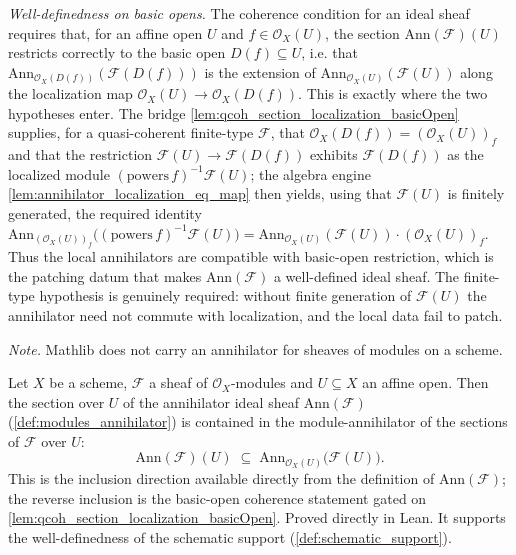 \begin{definition}
  \emph{Well-definedness on basic opens.} The coherence condition for an ideal
  sheaf requires that, for an affine open \(U\) and \(f \in \mathcal{O}_X(U)\),
  the section \(\mathrm{Ann}(\mathcal{F})(U)\) restricts correctly to the basic
  open \(D(f) \subseteq U\), i.e. that
  \(\mathrm{Ann}_{\mathcal{O}_X(D(f))}(\mathcal{F}(D(f)))\) is the extension of
  \(\mathrm{Ann}_{\mathcal{O}_X(U)}(\mathcal{F}(U))\) along the localization map
  \(\mathcal{O}_X(U) \to \mathcal{O}_X(D(f))\). This is exactly where the two
  hypotheses enter. The bridge
  \cref{lem:qcoh_section_localization_basicOpen} supplies, for a quasi-coherent
  finite-type \(\mathcal{F}\), that \(\mathcal{O}_X(D(f)) = (\mathcal{O}_X(U))_f\)
  and that the restriction \(\mathcal{F}(U) \to \mathcal{F}(D(f))\) exhibits
  \(\mathcal{F}(D(f))\) as the localized module \((\mathrm{powers}\,f)^{-1}
  \mathcal{F}(U)\); the algebra engine
  \cref{lem:annihilator_localization_eq_map} then yields, using that
  \(\mathcal{F}(U)\) is finitely generated, the required identity
  \(\mathrm{Ann}_{(\mathcal{O}_X(U))_f}\bigl((\mathrm{powers}\,f)^{-1}
  \mathcal{F}(U)\bigr) = \mathrm{Ann}_{\mathcal{O}_X(U)}(\mathcal{F}(U)) \cdot
  (\mathcal{O}_X(U))_f\). Thus the local annihilators are compatible with basic-open
  restriction, which is the patching datum that makes \(\mathrm{Ann}(\mathcal{F})\)
  a well-defined ideal sheaf. The finite-type hypothesis is genuinely required:
  without finite generation of \(\mathcal{F}(U)\) the annihilator need not commute
  with localization, and the local data fail to patch.

  \emph{Note.} Mathlib does not carry an annihilator for sheaves of modules on a scheme.
\end{definition}

\begin{lemma}
  \label{lem:modules_annihilator_ideal_le}
  Let \(X\) be a scheme, \(\mathcal{F}\) a sheaf of \(\mathcal{O}_X\)-modules and
  \(U \subseteq X\) an affine open. Then the section over \(U\) of the annihilator
  ideal sheaf \(\mathrm{Ann}(\mathcal{F})\) (\cref{def:modules_annihilator}) is
  contained in the module-annihilator of the sections of \(\mathcal{F}\) over
  \(U\):
  \[
    \mathrm{Ann}(\mathcal{F})(U)
    \;\subseteq\; \mathrm{Ann}_{\mathcal{O}_X(U)}\bigl(\mathcal{F}(U)\bigr).
  \]
  This is the inclusion direction available directly from the definition of
  \(\mathrm{Ann}(\mathcal{F})\); the reverse inclusion is the basic-open coherence
  statement gated on \cref{lem:qcoh_section_localization_basicOpen}. Proved directly
  in Lean. It supports the well-definedness of the schematic support
  (\cref{def:schematic_support}).
\end{lemma}


